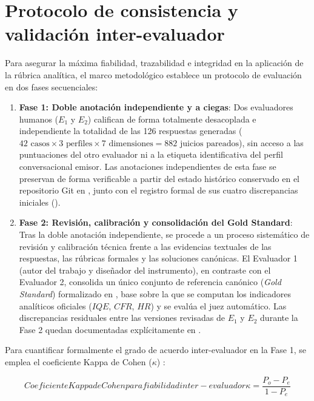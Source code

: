 \section{Protocolo de consistencia y validación inter-evaluador}
\label{sec:concordancia_inter_evaluador}
Para asegurar la máxima fiabilidad, trazabilidad e integridad en la aplicación de la rúbrica analítica, el marco metodológico establece un protocolo de evaluación en dos fases secuenciales:

\begin{enumerate}
    \item \textbf{Fase 1: Doble anotación independiente y a ciegas}: Dos evaluadores humanos ($E_1$ y $E_2$) califican de forma totalmente desacoplada e independiente la totalidad de las 126 respuestas generadas ($42 \text{ casos} \times 3 \text{ perfiles} \times 7 \text{ dimensiones} = 882 \text{ juicios pareados}$), sin acceso a las puntuaciones del otro evaluador ni a la etiqueta identificativa del perfil conversacional emisor. Las anotaciones independientes de esta fase se preservan de forma verificable a partir del estado histórico conservado en el repositorio Git en , junto con el registro formal de sus cuatro discrepancias iniciales ().
    \item \textbf{Fase 2: Revisión, calibración y consolidación del Gold Standard}: Tras la doble anotación independiente, se procede a un proceso sistemático de revisión y calibración técnica frente a las evidencias textuales de las respuestas, las rúbricas formales y las soluciones canónicas. El Evaluador 1 (autor del trabajo y diseñador del instrumento), en contraste con el Evaluador 2, consolida un único conjunto de referencia canónico (\textit{Gold Standard}) formalizado en , base sobre la que se computan los indicadores analíticos oficiales ($IQE$, $CFR$, $HR$) y se evalúa el juez automático. Las discrepancias residuales entre las versiones revisadas de $E_1$ y $E_2$ durante la Fase 2 quedan documentadas explícitamente en .
\end{enumerate}

Para cuantificar formalmente el grado de acuerdo inter-evaluador en la Fase 1, se emplea el coeficiente Kappa de Cohen ($\kappa$) \cite{cohen1960coefficient,landis1977measurement}:

\begin{equation}[EQ:COHENKAPPA]{Coeficiente Kappa de Cohen para fiabilidad inter-evaluador}
    \kappa = \frac{P_o - P_e}{1 - P_e}
\end{equation}

